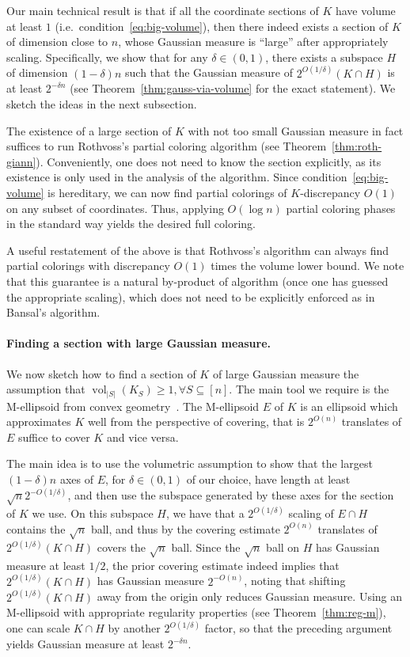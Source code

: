 \documentclass[11pt]{article}
\DeclareMathOperator{\vol}{vol}
\begin{document}
Our main technical result is that if all the coordinate sections of
$K$ have volume at least $1$ (i.e.~condition~\ref{eq:big-volume}), then there indeed
exists a section of $K$ of dimension close to $n$, whose Gaussian measure is
``large'' after appropriately scaling. Specifically, we show that for any
$\delta \in (0,1)$, there exists a subspace $H$ of dimension $(1-\delta)n$ such
that the Gaussian measure of $2^{O(1/\delta)} (K \cap H)$ is at least
$2^{-\delta n}$ (see Theorem~\ref{thm:gauss-via-volume} for the exact
statement). We sketch the ideas in the next subsection.

The existence of a large section of $K$ with not too small Gaussian measure in
fact suffices to run Rothvoss's partial coloring algorithm (see
Theorem~\ref{thm:roth-giann}). Conveniently, one does not need to know the
section explicitly, as its existence is only used in the analysis of the
algorithm. Since condition~\ref{eq:big-volume} is hereditary, we can now
find partial colorings of $K$-discrepancy $O(1)$ on any subset of coordinates.
Thus, applying $O(\log n)$ partial coloring phases in the standard way yields
the desired full coloring. 

A useful restatement of the above is that Rothvoss's algorithm can always find
partial colorings with discrepancy $O(1)$ times the volume
lower bound. We note that this guarantee is a natural by-product of algorithm
(once one has guessed the appropriate scaling), which does not need to be
explicitly enforced as in Bansal's algorithm.

\paragraph{\bf Finding a section with large Gaussian measure.} We now sketch how
to find a section of $K$ of large Gaussian measure the assumption that
$\vol_{|S|}(K_S) \geq 1, \forall S \subseteq [n]$. The main tool we require is
the M-ellipsoid from convex geometry~\cite{Milman86-reverseBM}. The M-ellipsoid
$E$ of $K$ is an ellipsoid which approximates $K$ well from the perspective of
covering, that is $2^{O(n)}$ translates of $E$ suffice to cover $K$ and vice
versa. 

The main idea is to use the volumetric assumption to show that the largest
$(1-\delta)n$ axes of $E$, for $\delta \in (0,1)$ of our choice, have length at
least $\sqrt{n}2^{-O(1/\delta)}$, and then use the subspace generated by these
axes for the section of $K$ we use. On this subspace $H$, we have that a
$2^{O(1/\delta)}$ scaling of $E \cap H$ contains the $\sqrt{n}$ ball, and thus
by the covering estimate $2^{O(n)}$ translates of $2^{O(1/\delta)}(K \cap H)$
covers the $\sqrt{n}$ ball. Since the $\sqrt{n}$ ball on $H$ has Gaussian
measure at least $1/2$, the prior covering estimate indeed implies that
$2^{O(1/\delta)}(K \cap H)$ has Gaussian measure $2^{-O(n)}$, noting that
shifting $2^{O(1/\delta)}(K \cap H)$ away from the origin only reduces Gaussian
measure. Using an M-ellipsoid with appropriate regularity properties (see
Theorem~\ref{thm:reg-m}), one can scale $K \cap H$ by another $2^{O(1/\delta)}$
factor, so that the preceding argument yields Gaussian measure at least
$2^{-\delta n}$. 
\end{document}
